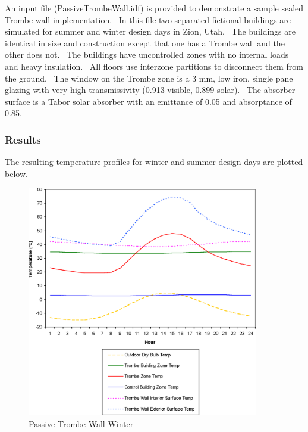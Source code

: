 An input file (PassiveTrombeWall.idf) is provided to demonstrate a sample sealed Trombe wall implementation.~ In this file two separated fictional buildings are simulated for summer and winter design days in Zion, Utah.~ The buildings are identical in size and construction except that one has a Trombe wall and the other does not.~ The buildings have uncontrolled zones with no internal loads and heavy insulation.~ All floors use interzone partitions to disconnect them from the ground.~ The window on the Trombe zone is a 3 mm, low iron, single pane glazing with very high transmissivity (0.913 visible, 0.899 solar).~ The absorber surface is a Tabor solar absorber with an emittance of 0.05 and absorptance of 0.85.

\subsubsection{Results}\label{results-000}

The resulting temperature profiles for winter and summer design days are plotted below.

\begin{figure}[hbtp] %
\centering
\includegraphics[width=0.9\textwidth, height=0.9\textheight, keepaspectratio=true]{media/image6831.png}
\caption{Passive Trombe Wall Winter \protect \label{fig:passive-trombe-wall-winter}}
\end{figure}

